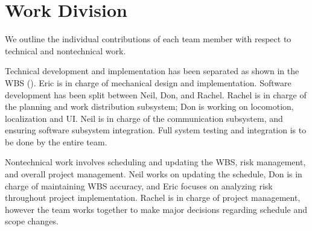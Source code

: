 
\section{Work Division}
\label{sec:work_division}

We outline the individual contributions of each team member with respect to technical and nontechnical work.

Technical development and implementation has been separated as shown in the WBS (). Eric is in charge of mechanical design and implementation. Software development has been split between Neil, Don, and Rachel. Rachel is in charge of the planning and work distribution subsystem; Don is working on locomotion, localization and UI. Neil is in charge of the communication subsystem, and ensuring software subsystem integration. Full system testing and integration is to be done by the entire team.

Nontechnical work involves scheduling and updating the WBS, risk management, and overall project management. Neil works on updating the schedule, Don is in charge of maintaining WBS accuracy, and Eric focuses on analyzing risk throughout project implementation. Rachel is in charge of project management, however the team works together to make major decisions regarding schedule and scope changes.
